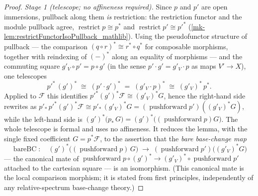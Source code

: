 \begin{proof}
  \emph{Stage 1 (telescope; no affineness required).} Since \(p\) and \(p'\) are open immersions,
  pullback along them \emph{is} restriction: the restriction functor and the module pullback
  agree, \(\operatorname{restrict} p \cong p^*\) and \(\operatorname{restrict} p' \cong p'^*\)
  (\ref{mk-lem:restrictFunctorIsoPullback_mathlib}). Using the pseudofunctor structure of pullback
  --- the comparison \((q \circ r)^* \cong r^* \circ q^*\) for composable morphisms, together with
  reindexing of \((-)^*\) along an equality of morphisms --- and the commuting square
  \(g'_V \circ p' = p \circ g'\) (in the sense \(p' \cdot g' = g'_V \cdot p\) as maps
  \(V' \to X\)), one telescopes
  \[
    p'^*\,(g')^*
      \;\cong\; (p' \cdot g')^*
      \;=\; (g'_V \cdot p)^*
      \;\cong\; (g'_V)^*\,p^* .
  \]
  Applied to \(\mathcal{F}\) this identifies \(p'^*(g')^*\mathcal{F} \cong (g'_V)^* G\), hence the
  right-hand side rewrites as
  \(p'_*\,p'^*(g')^*\mathcal{F} \cong p'_*\,(g'_V)^* G = (\operatorname{pushforward} p')
  ((g'_V)^* G)\), while the left-hand side is
  \((g')^*\bigl(p_*\,G\bigr) = (g')^*\bigl((\operatorname{pushforward} p) G\bigr)\). The whole
  telescope is formal and uses no affineness. It reduces the lemma, with the single fixed
  coefficient \(G = p^*\mathcal{F}\), to the assertion that the \emph{bare base-change map}
  \[
    \operatorname{bareBC} \colon\quad
    (g')^*\bigl((\operatorname{pushforward} p)\,G\bigr)
      \;\longrightarrow\;
    (\operatorname{pushforward} p')\bigl((g'_V)^* G\bigr)
  \]
  --- the canonical mate of \(\operatorname{pushforward} p \circ (g')^* \to (g'_V)^* \circ
  \operatorname{pushforward} p'\) attached to the cartesian square --- is an isomorphism. (This
  canonical mate is the local comparison morphism; it is stated from first principles,
  independently of any relative-spectrum base-change theory.)


\end{proof}
